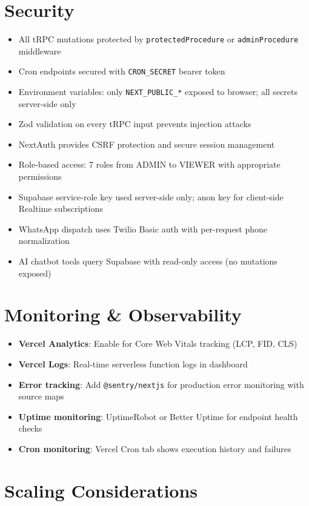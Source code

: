 \documentclass[12pt,a4paper]{report}
\begin{document}
\section{Security}

\begin{itemize}
  \item All tRPC mutations protected by \texttt{protectedProcedure} or \texttt{adminProcedure} middleware
  \item Cron endpoints secured with \texttt{CRON\_SECRET} bearer token
  \item Environment variables: only \texttt{NEXT\_PUBLIC\_*} exposed to browser; all secrets server-side only
  \item Zod validation on every tRPC input prevents injection attacks
  \item NextAuth provides CSRF protection and secure session management
  \item Role-based access: 7 roles from ADMIN to VIEWER with appropriate permissions
  \item Supabase service-role key used server-side only; anon key for client-side Realtime subscriptions
  \item WhatsApp dispatch uses Twilio Basic auth with per-request phone normalization
  \item AI chatbot tools query Supabase with read-only access (no mutations exposed)
\end{itemize}

\section{Monitoring \& Observability}

\begin{itemize}
  \item \textbf{Vercel Analytics}: Enable for Core Web Vitals tracking (LCP, FID, CLS)
  \item \textbf{Vercel Logs}: Real-time serverless function logs in dashboard
  \item \textbf{Error tracking}: Add \texttt{@sentry/nextjs} for production error monitoring with source maps
  \item \textbf{Uptime monitoring}: UptimeRobot or Better Uptime for endpoint health checks
  \item \textbf{Cron monitoring}: Vercel Cron tab shows execution history and failures
\end{itemize}

\section{Scaling Considerations}
\end{document}
